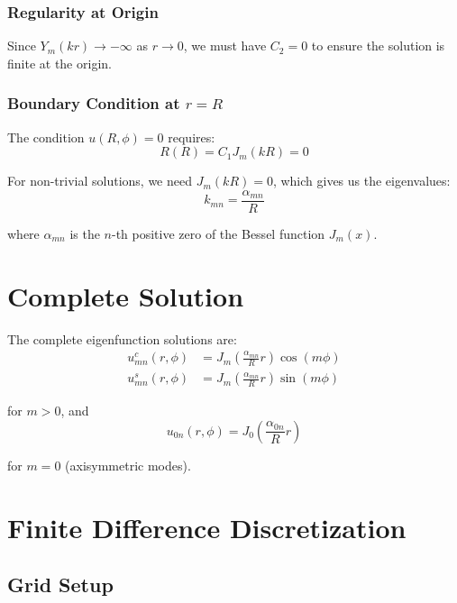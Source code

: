 \documentclass[11pt,a4paper]{article}
\begin{document}
\subsubsection{Regularity at Origin}
Since $Y_m(kr) \to -\infty$ as $r \to 0$, we must have $C_2 = 0$ to ensure the solution is finite at the origin.

\subsubsection{Boundary Condition at $r = R$}
The condition $u(R,\phi) = 0$ requires:
\begin{equation}
R(R) = C_1 J_m(kR) = 0 \label{eq:bc_radial}
\end{equation}

For non-trivial solutions, we need $J_m(kR) = 0$, which gives us the eigenvalues:
\begin{equation}
k_{mn} = \frac{\alpha_{mn}}{R} \label{eq:eigenvalues}
\end{equation}

where $\alpha_{mn}$ is the $n$-th positive zero of the Bessel function $J_m(x)$.

\section{Complete Solution}

The complete eigenfunction solutions are:
\begin{align}
u_{mn}^c(r,\phi) &= J_m\left(\frac{\alpha_{mn}}{R} r\right) \cos(m\phi) \label{eq:cosine_modes} \\
u_{mn}^s(r,\phi) &= J_m\left(\frac{\alpha_{mn}}{R} r\right) \sin(m\phi) \label{eq:sine_modes}
\end{align}

for $m > 0$, and
\begin{equation}
u_{0n}(r,\phi) = J_0\left(\frac{\alpha_{0n}}{R} r\right) \label{eq:axisymmetric_modes}
\end{equation}

for $m = 0$ (axisymmetric modes).

\section{Finite Difference Discretization}

\subsection{Grid Setup}
\end{document}
